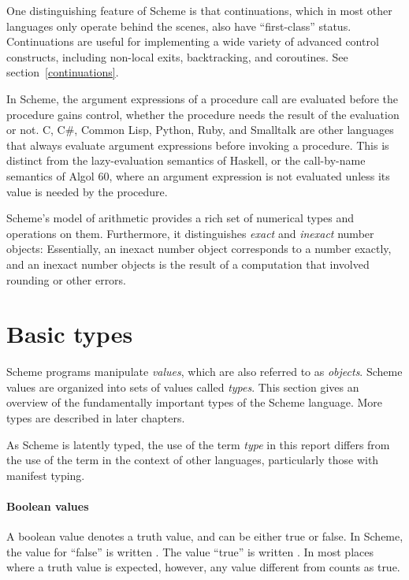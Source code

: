 \vest One distinguishing feature of Scheme is that continuations, which
in most other languages only operate behind the scenes, also have
``first-class'' status.  Continuations are useful for implementing a
wide variety of advanced control constructs, including non-local exits,
backtracking, and coroutines.  See section~\ref{continuations}.

In Scheme, the argument expressions of a procedure call are evaluated
before the procedure gains control, whether the procedure needs the
result of the evaluation or not.  C, C\#, Common Lisp, Python,
Ruby, and Smalltalk are other languages that always evaluate argument
expressions before invoking a procedure.  This is distinct from the
lazy-evaluation semantics of Haskell, or the call-by-name semantics of
Algol 60, where an argument expression is not evaluated unless its
value is needed by the procedure.

Scheme's model of arithmetic provides a rich set of numerical types
and operations on them.  Furthermore, it distinguishes \textit{exact}
and \textit{inexact} number objects: Essentially, an inexact number
object corresponds to a number exactly, and an inexact number objects
is the result of a computation that involved rounding or other errors.

\section{Basic types}

Scheme programs manipulate \textit{values}, which are also referred
to as \textit{objects}.
Scheme values are organized into sets of values called \textit{types}.
This section gives an overview of the fundamentally important types of the
Scheme language.  More types are described in later chapters.

\begin{note}
  As Scheme is latently typed, the use of the term \textit{type} in
  this report differs from the use of the term in the context of other
  languages, particularly those with manifest typing.
\end{note}

\paragraph{Boolean values}

A boolean value denotes a truth value, and can be either
true or false.  In Scheme, the value for ``false'' is written
\schfalse{}.  The value ``true'' is written \schtrue{}.  In
most places where a truth value is expected, however, any value different from
\schfalse{} counts as true.

